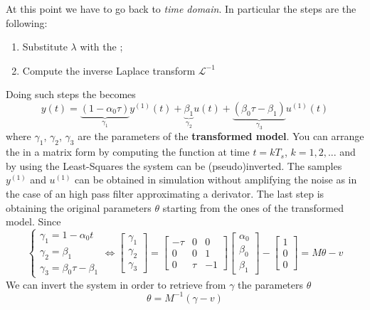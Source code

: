 At this point we have to go back to \textit{time domain}. In particular the steps are the following:
\begin{enumerate}
    \itemsep-0.2em
    \item Substitute $\lambda$ with the ; 
    \item Compute the inverse Laplace transform $\mathcal{L}^{-1}$ 
\end{enumerate}
Doing such steps the  becomes
\begin{equation}\label{eq:time_back}
    y(t)= \underbrace{(1-\alpha_0\tau)}_{\gamma_1} 
    y^{(1)}(t) + 
    \underbrace{\beta_1}_{\gamma_2} 
    {u(t)} 
    + \underbrace{(\beta_0\tau-\beta_1)}_{\gamma_3} u^{(1)}(t)
\end{equation}
where $\gamma_1$, $\gamma_2$, $\gamma_3$ are the parameters of the \textbf{transformed model}. You can arrange the  in a matrix form by computing the function at time $t=kT_s$, $k=1,2,...$ and by using the Least-Squares the system can be (pseudo)inverted. The samples $y^{(1)}$ and $u^{(1)}$ can be obtained in simulation without amplifying the noise as in the case of an high pass filter approximating a derivator. The last step is obtaining the original parameters $\theta$ starting from the ones of the transformed model. Since
\begin{equation}
    \begin{cases}
        \gamma_1=1-\alpha_0t\\
        \gamma_2=\beta_1\\  
        \gamma_3=\beta_0\tau-\beta_1
    \end{cases} \iff \begin{bmatrix}
        \gamma_1\\\gamma_2\\\gamma_3
    \end{bmatrix}=\begin{bmatrix}
        -\tau&0&0\\
        0&0&1\\
        0&\tau&-1
    \end{bmatrix} \begin{bmatrix}
        \alpha_0\\
        \beta_0\\
        \beta_1
    \end{bmatrix}-\begin{bmatrix}
        1\\0\\0
    \end{bmatrix}=M\theta-v
\end{equation}
We can invert the system in order to retrieve from $\gamma$ the parameters $\theta$
\begin{equation}
    \theta = M^{-1}(\gamma-v)
\end{equation}

